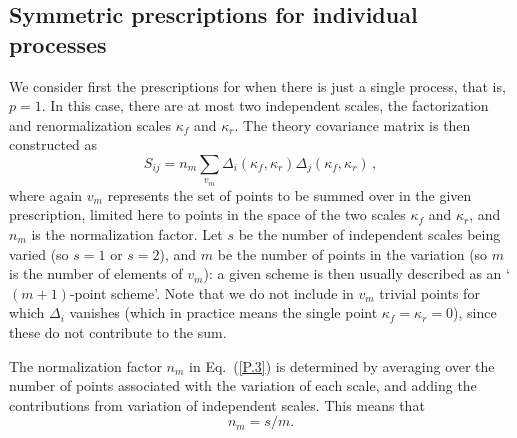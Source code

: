 \subsection{Symmetric prescriptions for individual processes}
\label{sec:sympres}

We  consider first the prescriptions for when there is just a
single process, that is, $p=1$.
%
In this case, there are at most two
independent scales, the factorization and renormalization scales $\kappa_f$ and $\kappa_r$. The theory covariance matrix is then constructed as
\begin{equation}
  \label{P.3}
  S_{ij} = n_{m} \sum_{v_{m}} \Delta_{i} (\kappa_f, \kappa_r)\Delta_{j} (\kappa_f, \kappa_r)\, ,
\end{equation}
where again $v_m$ represents the set of points to be summed over in the given
prescription, limited here to points in the space of the two scales
$\kappa_f$ and $\kappa_r$, and $n_m$ is the normalization factor.
%
Let $s$ be
the number of independent scales being varied (so $s=1$ or $s=2$), and
$m$ be the number of points in the variation (so $m$ is the number of
elements of $v_m$): a given scheme is then usually described as an
`$(m+1)$-point scheme'.
%
Note that we do not include in $v_m$ trivial points
for which $\Delta_{i}$ vanishes (which in practice means the single
point $\kappa_f=\kappa_r=0$), since these do not contribute to the
sum. 

The normalization factor $n_m$ in Eq.~(\ref{P.3})
is determined by averaging over the number of
points associated with the variation of each scale,  and adding the
contributions from variation of independent scales. This means that  
\begin{equation}
  \label{P.4}
n_m = s/m.
\end{equation}

